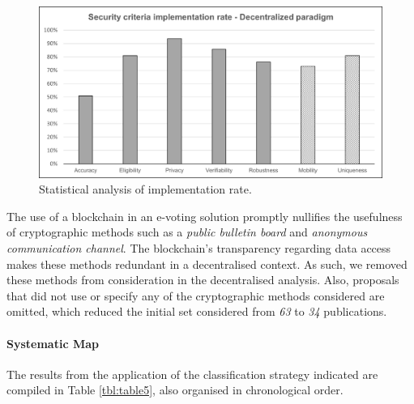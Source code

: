\documentclass[../access.tex]{subfiles}
\begin{document}
	\begin{figure}[ht!]
        \centering
        \includegraphics[width=\columnwidth]{Images/almei5.png}
        \caption{Statistical analysis of implementation rate.}
        \label{fig:implementation-rate-decentralized}
    \end{figure}

    The use of a blockchain in an e-voting solution promptly nullifies the usefulness of cryptographic methods such as a \textit{public bulletin board} and \textit{anonymous communication channel}. The blockchain's transparency regarding data access makes these methods redundant in a decentralised context. As such, we removed these methods from consideration in the decentralised analysis. Also, proposals that did not use or specify any of the cryptographic methods considered are omitted, which reduced the initial set considered from \textit{63} to \textit{34} publications.

\paragraph{Systematic Map}
    The results from the application of the classification strategy indicated are compiled in Table \ref{tbl:table5}, also organised in chronological order.
\end{document}
